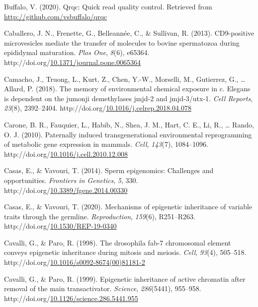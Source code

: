 \documentclass[12pt,twoside]{reedthesis}
\newlength{\cslhangindent}
\newenvironment{CSLReferences}[2] %
 {%
  \setlength{\parindent}{0pt}
  \ifodd #1 \everypar{\setlength{\hangindent}{\cslhangindent}}\ignorespaces\fi
  \ifnum #2 > 0
  \setlength{\parskip}{#2\baselineskip}
  \fi
 }%
 {}
\begin{document}
\begin{CSLReferences}{1}{0}
\leavevmode{}%
Buffalo, V. (2020). Qrqc: Quick read quality control. Retrieved from \url{http://github.com/vsbuffalo/qrqc}

\leavevmode{}%
Caballero, J. N., Frenette, G., Belleannée, C., \& Sullivan, R. (2013). {CD9}-positive microvesicles mediate the transfer of molecules to bovine spermatozoa during epididymal maturation. \emph{Plos One}, \emph{8}(6), e65364. http://doi.org/\href{https://doi.org/10.1371/journal.pone.0065364}{10.1371/journal.pone.0065364}

\leavevmode{}%
Camacho, J., Truong, L., Kurt, Z., Chen, Y.-W., Morselli, M., Gutierrez, G., \ldots{} Allard, P. (2018). The memory of environmental chemical exposure in c. Elegans is dependent on the jumonji demethylases jmjd-2 and jmjd-3/utx-1. \emph{Cell Reports}, \emph{23}(8), 2392--2404. http://doi.org/\href{https://doi.org/10.1016/j.celrep.2018.04.078}{10.1016/j.celrep.2018.04.078}

\leavevmode{}%
Carone, B. R., Fauquier, L., Habib, N., Shea, J. M., Hart, C. E., Li, R., \ldots{} Rando, O. J. (2010). Paternally induced transgenerational environmental reprogramming of metabolic gene expression in mammals. \emph{Cell}, \emph{143}(7), 1084--1096. http://doi.org/\href{https://doi.org/10.1016/j.cell.2010.12.008}{10.1016/j.cell.2010.12.008}

\leavevmode{}%
Casas, E., \& Vavouri, T. (2014). Sperm epigenomics: Challenges and opportunities. \emph{Frontiers in Genetics}, \emph{5}, 330. http://doi.org/\href{https://doi.org/10.3389/fgene.2014.00330}{10.3389/fgene.2014.00330}

\leavevmode{}%
Casas, E., \& Vavouri, T. (2020). Mechanisms of epigenetic inheritance of variable traits through the germline. \emph{Reproduction}, \emph{159}(6), R251--R263. http://doi.org/\href{https://doi.org/10.1530/REP-19-0340}{10.1530/REP-19-0340}

\leavevmode{}%
Cavalli, G., \& Paro, R. (1998). The drosophila fab-7 chromosomal element conveys epigenetic inheritance during mitosis and meiosis. \emph{Cell}, \emph{93}(4), 505--518. http://doi.org/\href{https://doi.org/10.1016/s0092-8674(00)81181-2}{10.1016/s0092-8674(00)81181-2}

\leavevmode{}%
Cavalli, G., \& Paro, R. (1999). Epigenetic inheritance of active chromatin after removal of the main transactivator. \emph{Science}, \emph{286}(5441), 955--958. http://doi.org/\href{https://doi.org/10.1126/science.286.5441.955}{10.1126/science.286.5441.955}


\end{CSLReferences}
\end{document}
